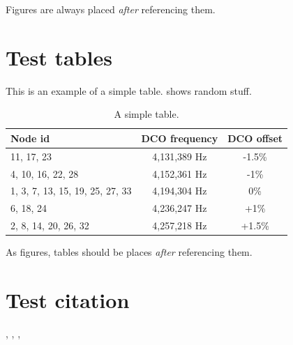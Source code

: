 Figures are always placed \emph{after} referencing them.

\section{Test tables}

This is an example of a simple table.  shows random stuff.
%
\begin{table}[htb]
	\centering
	\caption{A simple table.}
	\begin{tabular}{l c c}
		\toprule
		Node id & DCO frequency & DCO offset\\ \midrule
		11, 17, 23 & 4,131,389 Hz & -1.5\% \\
		4, 10, 16, 22, 28 & 4,152,361 Hz & -1\% \\
		1, 3, 7, 13, 15, 19, 25, 27, 33 & 4,194,304 Hz & 0\% \\
		6, 18, 24 & 4,236,247 Hz & +1\% \\
		2, 8, 14, 20, 26, 32 & 4,257,218 Hz & +1.5\% \\
		\bottomrule
	\end{tabular}
	\label{tab:flocklab_clock_offset}
\end{table}

As figures, tables should be places \emph{after} referencing them.

\section{Test citation}

\cite{Goehringer2013}, \cite{Logvinenko2014}, \cite{Ogras2013}, \cite{Rantala2006}
